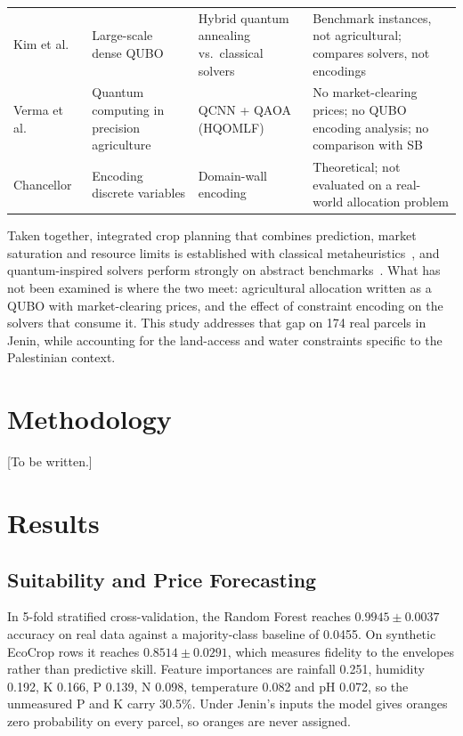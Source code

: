 \documentclass[conference,a4paper]{IEEEtran}
\begin{document}
\begin{table}[t]
\begin{tabular}{p{2.6cm}p{3.3cm}p{4.2cm}p{6.2cm}}
Kim et al.~\cite{kim2025} & Large-scale dense QUBO & Hybrid quantum annealing vs.\ classical solvers & Benchmark instances, not agricultural; compares solvers, not encodings \\
Verma et al.~\cite{verma2025} & Quantum computing in precision agriculture & QCNN + QAOA (HQOMLF) & No market-clearing prices; no QUBO encoding analysis; no comparison with SB \\
Chancellor~\cite{chancellor2019} & Encoding discrete variables & Domain-wall encoding & Theoretical; not evaluated on a real-world allocation problem \\
\bottomrule
\end{tabular}
\end{table}

Taken together, integrated crop planning that combines prediction, market
saturation and resource limits is established with classical
metaheuristics~\cite{li2025,hou2026}, and quantum-inspired solvers perform
strongly on abstract benchmarks~\cite{zeng2024,kim2025}. What has not been
examined is where the two meet: agricultural allocation written as a QUBO with
market-clearing prices, and the effect of constraint encoding on the solvers
that consume it. This study addresses that gap on 174 real parcels in Jenin,
while accounting for the land-access and water constraints specific to the
Palestinian context.

\section{Methodology}

[To be written.]

\section{Results}

\subsection{Suitability and Price Forecasting}

In 5-fold stratified cross-validation, the Random Forest reaches
$0.9945\pm0.0037$ accuracy on real data against a majority-class baseline of
0.0455. On synthetic EcoCrop rows it reaches $0.8514\pm0.0291$, which measures
fidelity to the envelopes rather than predictive skill. Feature importances are
rainfall 0.251, humidity 0.192, K 0.166, P 0.139, N 0.098, temperature 0.082
and pH 0.072, so the unmeasured P and K carry 30.5\%. Under Jenin's inputs the
model gives oranges zero probability on every parcel, so oranges are never
assigned.
\end{document}
